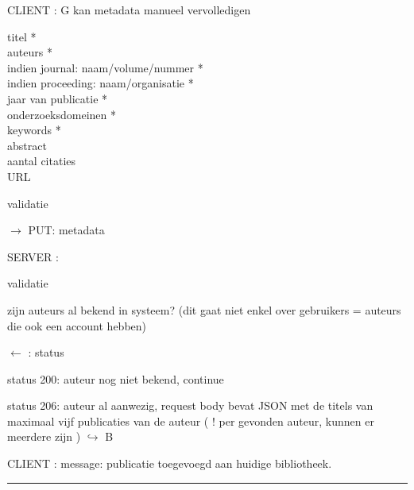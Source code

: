 \documentclass{article}
\begin{document}
\begin{description}
\item CLIENT :  G kan metadata manueel vervolledigen 
	\begin{description}
 	\item[titel * ]  \hfill 
  	\item[auteurs * ] \hfill 
  	\item[indien journal: naam/volume/nummer *] \hfill 
  	\item[indien proceeding: naam/organisatie *] \hfill 
  	\item[jaar van publicatie * ] \hfill 
  	\item[onderzoeksdomeinen *]  \hfill 
  	\item[keywords * ]  \hfill 
  	\item[abstract] \hfill 
   	\item[aantal citaties] \hfill 
    	\item[URL] \hfill 
  	\end{description}
	
	\begin{description}
	\item \checkmark validatie
	\item $\rightarrow$ PUT:  metadata
	\end{description}
	
\item SERVER :  
	\begin{description}
	\item \checkmark validatie
	\item \checkmark zijn auteurs al bekend in systeem? (dit gaat niet enkel over gebruikers = auteurs die ook een account hebben)
	\item $\leftarrow$ :   status
			\begin{description}
			\item status 200: auteur nog niet bekend, continue 
			\item status 206: auteur al aanwezig, request body bevat JSON met de titels van maximaal vijf publicaties van de auteur ( ! per gevonden auteur, kunnen er meerdere zijn )   $\hookrightarrow$ B
			\end{description}
	\end{description}
	
\item CLIENT :  message: publicatie toegevoegd aan huidige bibliotheek.

 \end{description}
 
 
\vspace{2 mm}
\hrule
\vspace{2 mm}
 
\end{document}
